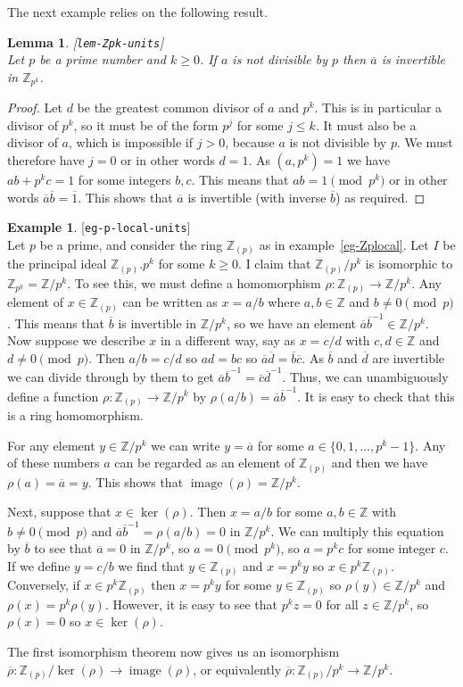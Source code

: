\documentclass{amsart}
\newcommand{\lbl}[1]{\label{#1}\textup{[\texttt{#1}]}\ \\}
\newcommand{\lbl}{\label}
\newcommand{\img}       {\operatorname{image}}
\newcommand{\Z}         {{\mathbb{Z}}}
\newcommand{\Zpl}       {{\mathbb{Z}_{(p)}}}
\newcommand{\ov}[1]     {\overline{#1}}
\newcommand{\xra}       {\xrightarrow}
\renewcommand{\:}{\colon}
\newtheorem{lemma}[theorem]{Lemma}
\theoremstyle{definition}
\newtheorem{example}[theorem]{Example}
\begin{document}
The next example relies on the following result.
\begin{lemma}\lbl{lem-Zpk-units}
 Let $p$ be a prime number and $k\geq 0$.  If $a$ is not divisible by
 $p$ then $\ov{a}$ is invertible in $\Z_{p^k}$.
\end{lemma}
\begin{proof}
 Let $d$ be the greatest common divisor of $a$ and $p^k$.  This is in
 particular a divisor of $p^k$, so it must be of the form $p^j$ for
 some $j\leq k$.  It must also be a divisor of $a$, which is
 impossible if $j>0$, because $a$ is not divisible by $p$.  We must
 therefore have $j=0$ or in other words $d=1$.  As $(a,p^k)=1$ we have
 $ab+p^kc=1$ for some integers $b,c$.  This means that
 $ab=1\pmod{p^k}$ or in other words $\ov{a}\ov{b}=\ov{1}$.  This shows
 that $\ov{a}$ is invertible (with inverse $\ov{b}$) as required.  
\end{proof}
\begin{example}\lbl{eg-p-local-units}
 Let $p$ be a prime, and consider the ring $\Zpl$ as in
 example~\ref{eg-Zplocal}.  Let $I$ be the principal ideal $\Zpl.p^k$ for
 some $k\geq 0$.  I claim that $\Zpl/p^k$ is isomorphic to
 $\Z_{p^k}=\Z/p^k$.  To see this, we must define a homomorphism
 $\rho\:\Zpl\xra{}\Z/p^k$.  Any element of $x\in\Zpl$ can be written as
 $x=a/b$ where $a,b\in\Z$ and $b\neq 0\pmod{p}$.  This means that
 $\ov{b}$ is invertible in $\Z/{p^k}$, so we have an element
 $\ov{a}\ov{b}^{-1}\in\Z/{p^k}$.  Now suppose we describe $x$ in a
 different way, say as $x=c/d$ with $c,d\in\Z$ and $d\neq 0\pmod{p}$.
 Then $a/b=c/d$ so $ad=bc$ so $\ov{a}\ov{d}=\ov{b}\ov{c}$.  As
 $\ov{b}$ and $\ov{d}$ are invertible we can divide through by them to
 get $\ov{a}\ov{b}^{-1}=\ov{c}\ov{d}^{-1}$.  Thus, we can
 unambiguously define a function $\rho\:\Zpl\xra{}\Z/{p^k}$ by
 $\rho(a/b)=\ov{a}\ov{b}^{-1}$.  It is easy to check that this is a
 ring homomorphism.  

 For any element $y\in\Z/{p^k}$ we can write $y=\ov{a}$ for some
 $a\in\{0,1,\ldots,p^k-1\}$.  Any of these numbers $a$ can be regarded
 as an element of $\Zpl$ and then we have $\rho(a)=\ov{a}=y$.  This
 shows that $\img(\rho)=\Z/{p^k}$.  

 Next, suppose that $x\in\ker(\rho)$.  Then $x=a/b$ for some
 $a,b\in\Z$ with $b\neq 0\pmod{p}$ and $\ov{a}\ov{b}^{-1}=\rho(a/b)=0$
 in $\Z/{p^k}$.  We can multiply this equation by $\ov{b}$ to see that
 $\ov{a}=0$ in $\Z/{p^k}$, so $a=0\pmod{p^k}$, so $a=p^kc$ for some
 integer $c$.  If we define $y=c/b$ we find that $y\in\Zpl$ and
 $x=p^ky$ so $x\in p^k\Zpl$.  Conversely, if $x\in p^k\Zpl$ then
 $x=p^ky$ for some $y\in\Zpl$ so $\rho(y)\in\Z/{p^k}$ and
 $\rho(x)=p^k\rho(y)$.  However, it is easy to see that $p^kz=0$ for
 all $z\in\Z/{p^k}$, so $\rho(x)=0$ so $x\in\ker(\rho)$.

 The first isomorphism theorem now gives us an isomorphism
 $\ov{\rho}\:\Zpl/\ker(\rho)\xra{}\img(\rho)$, or equivalently
 $\ov{\rho}\:\Zpl/p^k\xra{}\Z/{p^k}$.
\end{example}
\end{document}
